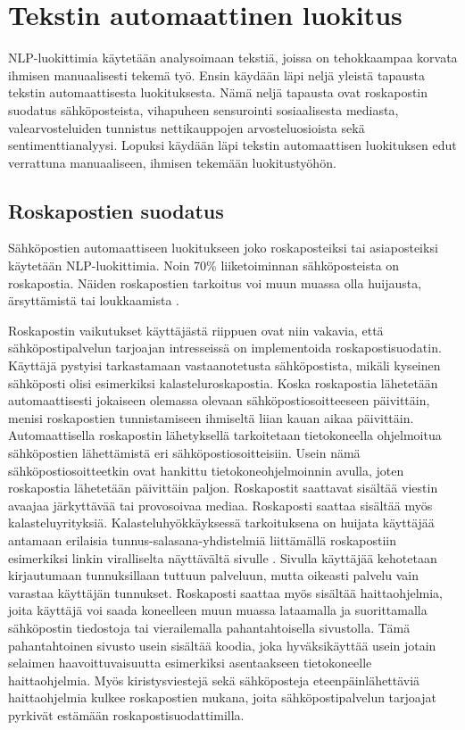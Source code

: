 \chapter{Tekstin automaattinen luokitus\label{methods}}

NLP-luokittimia käytetään analysoimaan tekstiä, joissa on tehokkaampaa korvata ihmisen manuaalisesti tekemä työ. Ensin käydään läpi neljä yleistä tapausta tekstin automaattisesta luokituksesta. Nämä neljä tapausta ovat roskapostin suodatus sähköposteista, vihapuheen sensurointi sosiaalisesta mediasta, valearvosteluiden tunnistus nettikauppojen arvosteluosioista sekä sentimenttianalyysi. Lopuksi käydään läpi tekstin automaattisen luokituksen edut verrattuna manuaaliseen, ihmisen tekemään luokitustyöhön.

\section{Roskapostien suodatus}

Sähköpostien automaattiseen luokitukseen joko roskaposteiksi tai asiaposteiksi käytetään NLP-luokittimia. Noin 70\% liiketoiminnan sähköposteista on roskapostia. Näiden roskapostien tarkoitus voi muun muassa olla huijausta, ärsyttämistä tai loukkaamista \citep{spam}.

Roskapostin vaikutukset käyttäjästä riippuen ovat niin vakavia, että sähköpostipalvelun tarjoajan intresseissä on implementoida roskapostisuodatin. Käyttäjä pystyisi tarkastamaan vastaanotetusta sähköpostista, mikäli kyseinen sähköposti olisi esimerkiksi kalasteluroskapostia. Koska roskapostia lähetetään automaattisesti jokaiseen olemassa olevaan sähköpostiosoitteeseen päivittäin, menisi roskapostien tunnistamiseen ihmiseltä liian kauan aikaa päivittäin. Automaattisella roskapostin lähetyksellä tarkoitetaan tietokoneella ohjelmoitua sähköpostien lähettämistä eri sähköpostiosoitteisiin. Usein nämä sähköpostiosoitteetkin ovat hankittu tietokoneohjelmoinnin avulla, joten roskapostia lähetetään päivittäin paljon. Roskapostit saattavat sisältää viestin avaajaa järkyttävää tai provosoivaa mediaa. Roskaposti saattaa sisältää myös kalasteluyrityksiä. Kalasteluhyökkäyksessä tarkoituksena on huijata käyttäjää antamaan erilaisia tunnus-salasana-yhdistelmiä liittämällä roskapostiin esimerkiksi linkin viralliselta näyttävältä sivulle \citep{phishing}. Sivulla käyttäjää kehotetaan kirjautumaan tunnuksillaan tuttuun palveluun, mutta oikeasti palvelu vain varastaa käyttäjän tunnukset. Roskaposti saattaa myös sisältää haittaohjelmia, joita käyttäjä voi saada koneelleen muun muassa lataamalla ja suorittamalla sähköpostin tiedostoja tai vierailemalla pahantahtoisella sivustolla. Tämä pahantahtoinen sivusto usein sisältää koodia, joka hyväksikäyttää usein jotain selaimen haavoittuvaisuutta esimerkiksi asentaakseen tietokoneelle haittaohjelmia. Myös kiristysviestejä sekä sähköposteja eteenpäinlähettäviä haittaohjelmia kulkee roskapostien mukana, joita sähköpostipalvelun tarjoajat pyrkivät estämään roskapostisuodattimilla.

